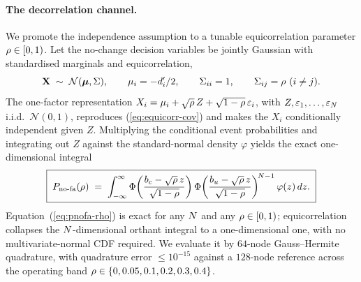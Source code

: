 \paragraph{The decorrelation channel.}
We promote the independence assumption to a tunable equicorrelation
parameter $\rho \in [0, 1)$. Let the no-change decision variables be
jointly Gaussian with standardised marginals and equicorrelation,
\begin{equation}
  \mathbf{X} \;\sim\; \mathcal{N}(\boldsymbol\mu, \Sigma),
  \qquad
  \mu_i = -d'_i/2,
  \qquad
  \Sigma_{ii} = 1,
  \qquad
  \Sigma_{ij} = \rho \ (i \neq j).
  \label{eq:equicorr-cov}
\end{equation}
The one-factor representation
$X_i = \mu_i + \sqrt{\rho}\,Z + \sqrt{1 - \rho}\,\varepsilon_i$, with
$Z, \varepsilon_1, \dots, \varepsilon_N$ i.i.d.\ $\mathcal{N}(0, 1)$,
reproduces (\ref{eq:equicorr-cov}) and makes the $X_i$ conditionally
independent given $Z$. Multiplying the conditional event probabilities
and integrating out $Z$ against the standard-normal density $\varphi$
yields the exact one-dimensional integral
\begin{equation}
  \boxed{\;
    P_{\mathrm{no\text{-}fa}}(\rho)
    \;=\;
    \int_{-\infty}^{\infty}
    \Phi\!\left(\frac{b_c - \sqrt{\rho}\,z}{\sqrt{1 - \rho}}\right)
    \Phi\!\left(\frac{b_u - \sqrt{\rho}\,z}{\sqrt{1 - \rho}}\right)^{\!N - 1}
    \varphi(z)\,dz.
  \;}
  \label{eq:pnofa-rho}
\end{equation}
Equation~(\ref{eq:pnofa-rho}) is exact for any $N$ and any
$\rho \in [0, 1)$; equicorrelation collapses the $N$-dimensional
orthant integral to a one-dimensional one, with no multivariate-normal
CDF required. We evaluate it by $64$-node Gauss--Hermite quadrature,
with quadrature error $\le 10^{-15}$ against a $128$-node reference
across the operating band $\rho \in \{0, 0.05, 0.1, 0.2, 0.3, 0.4\}$.

